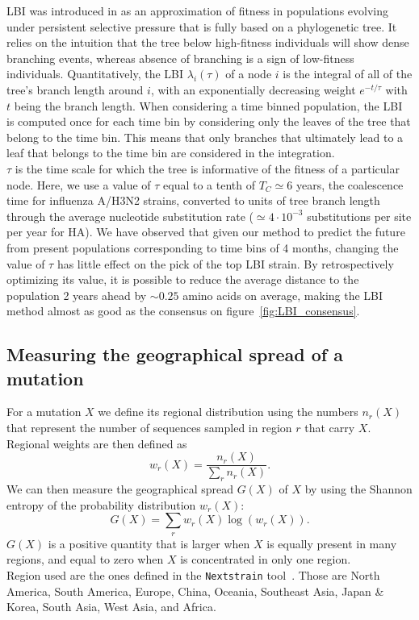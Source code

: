 \documentclass[reprint,amsmath,amssymb,superscriptaddress,showpacs,rmp]{revtex4-1}
\begin{document}
	LBI was introduced in \cite{neher_predicting_2014} as an approximation of fitness in populations evolving under persistent selective pressure that is fully based on a phylogenetic tree. It relies on the intuition that the tree below high-fitness individuals will show dense branching events, whereas absence of branching is a sign of low-fitness individuals. Quantitatively, the LBI $\lambda_i(\tau)$ of a node $i$ is the integral of all of the tree's branch length around $i$, with an exponentially decreasing weight $e^{-t/\tau}$ with $t$ being the branch length. When considering a time binned population, the LBI is computed once for each time bin by considering only the leaves of the tree that belong to the time bin. This means that only branches that ultimately lead to a leaf that belongs to the time bin are considered in the integration.\\ 
	$\tau$ is the time scale for which the tree is informative of the fitness of a particular node. Here, we use a value of $\tau$ equal to a tenth of $T_C\simeq6$ years, the coalescence time for influenza A/H3N2 strains, converted to units of tree branch length through the average nucleotide substitution rate ($\simeq 4\cdot 10^{-3}$ substitutions per site per year for HA). We have observed that given our method to predict the future from present populations corresponding to time bins of 4 months, changing the value of $\tau$ has little effect on the pick of the top LBI strain. By retrospectively optimizing its value, it is possible to reduce the average distance to the population 2 years ahead by $\sim0.25$ amino acids on average, making the LBI method almost as good as the consensus on figure~\ref{fig:LBI_consensus}. 


\subsection*{Measuring the geographical spread of a mutation} %
\label{sub:measuring_the_geographical_spread_of_a_mutation}
	For a mutation $X$ we define its regional distribution using the numbers $n_r(X)$ that represent the number of sequences sampled in region $r$ that carry $X$. Regional weights are then defined as 
	$$ w_r(X) = \frac{n_r(X)}{\sum_{r}n_r(X)}.$$
	We can then measure the geographical spread $G(X)$ of $X$ by using the Shannon entropy of the probability distribution $w_r(X)$: 
	$$G(X) = \sum_r w_r(X)\log(w_r(X)).$$
	$G(X)$ is a positive quantity that is larger when $X$ is equally present in many regions, and equal to zero when $X$ is concentrated in only one region.\\
	Region used are the ones defined in the \texttt{Nextstrain} tool~\cite{10.1093/bioinformatics/bty407}. Those are {North America}, {South America}, {Europe}, {China}, {Oceania}, {Southeast Asia}, {Japan \& Korea}, {South Asia}, {West Asia}, and {Africa}.
\end{document}
